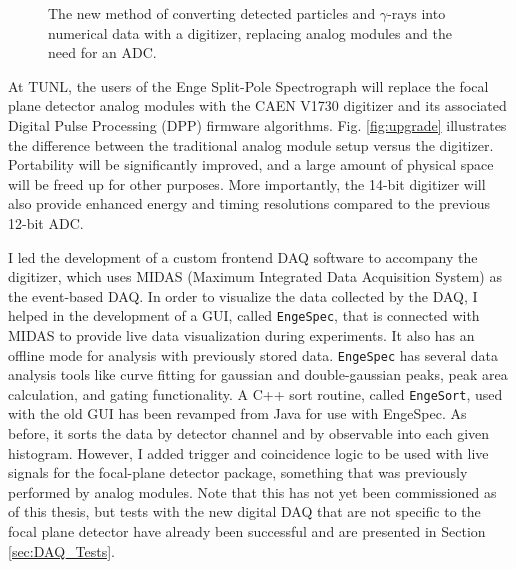 \begin{figure}[t]
\begin{tikzpicture}[scale=1.25, every node/.style={transform shape}]
\end{tikzpicture}
\caption{\label{fig:new_electronics}The new method of converting detected particles and $\gamma$-rays into numerical data with a digitizer, replacing analog modules and the need for an ADC.}
\end{figure}

At TUNL, the users of the Enge Split-Pole Spectrograph will replace the focal plane detector analog modules with the CAEN V1730 digitizer and its associated Digital Pulse Processing (DPP) firmware algorithms. Fig. \ref{fig:upgrade} illustrates the difference between the traditional analog module setup versus the digitizer. Portability will be significantly improved, and a large amount of physical space will be freed up for other purposes. More importantly, the 14-bit digitizer will also provide enhanced energy and timing resolutions compared to the previous 12-bit ADC.

I led the development of a custom frontend DAQ software to accompany the digitizer, which uses MIDAS (Maximum Integrated Data Acquisition System) as the event-based DAQ. 
In order to visualize the data collected by the DAQ, I helped in the development of a GUI, called \texttt{EngeSpec}, that is connected with MIDAS to provide live data visualization during experiments. It also has an offline mode for analysis with previously stored data. \texttt{EngeSpec} has several data analysis tools like curve fitting for gaussian and double-gaussian peaks, peak area calculation, and gating functionality. A C++ sort routine, called \texttt{EngeSort}, used with the old GUI has been revamped from Java for use with EngeSpec. As before, it sorts the data by detector channel and by observable into each given histogram. However, I added trigger and coincidence logic to be used with live signals for the focal-plane detector package, something that was previously performed by analog modules. Note that this has not yet been commissioned as of this thesis, but tests with the new digital DAQ that are not specific to the focal plane detector have already been successful and are presented in Section \ref{sec:DAQ_Tests}.




